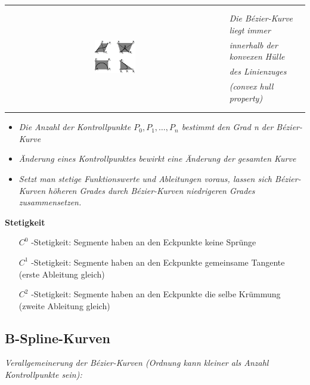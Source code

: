 \begin{tabular}{cl}
    \multirow{8}{*}{
        \includegraphics[width=0.19\textwidth]{assets/curves-qubic-besier-curve.png}
    } & \\
    & \\
    & \textit{Die Bézier-Kurve liegt immer}\\
    & \textit{innerhalb der konvexen Hülle}\\
    & \textit{des Linienzuges} \\
    & \textit{(convex hull property)} \\
    & \\
    & \\
\end{tabular}
\begin{itemize}
    \item \textit{Die Anzahl der Kontrollpunkte $P_0, P_1, \dots, P_n$
    bestimmt den Grad n der Bézier-Kurve}\\
    \item \textit{Änderung eines Kontrollpunktes bewirkt eine
    Änderung der gesamten Kurve}\\
    \item \textit{Setzt man stetige Funktionswerte und
    Ableitungen voraus, lassen sich Bézier-Kurven
    höheren Grades durch Bézier-Kurven
    niedrigeren Grades zusammensetzen.}\\
\end{itemize}
\textbf{Stetigkeit}
\begin{itemize}
    \item[$C^0$]-Stetigkeit: Segmente haben an den Eckpunkte keine Sprünge
    \item[$C^1$]-Stetigkeit: Segmente haben an den Eckpunkte gemeinsame Tangente (erste Ableitung gleich)
    \item[$C^2$]-Stetigkeit: Segmente haben an den Eckpunkte die selbe Krümmung (zweite Ableitung gleich)
\end{itemize}

\subsection{B-Spline-Kurven}

\textit{Verallgemeinerung der Bézier-Kurven
(Ordnung kann kleiner als Anzahl Kontrollpunkte sein):}\\

